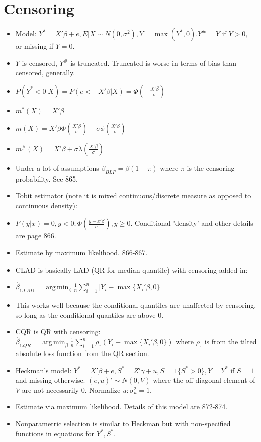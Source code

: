\documentclass[11pt]{article} %
\DeclareMathOperator*{\argmin}{arg\,min}
\begin{document}
\section{Censoring}
\begin{itemize}
\item Model: $Y^{*} = X'\beta + e, E|X \sim N(0,\sigma^2), Y = \max (Y^{*},0). Y^{\#} = Y$ if $Y>0,$ or missing if $Y=0$. 
\item $Y$ is censored, $Y^{\#}$ is truncated. Truncated is worse in terms of bias than censored, generally.
\item $P(Y^{*}<0|X) = P(e<-X'\beta|X) = \Phi\left(-\frac{X'\beta}{\sigma}\right)$
\item $m^{*}(X) = X'\beta$
\item $m(X) = X'\beta \Phi \left( \frac{X'\beta}{\sigma} \right) + \sigma \phi \left( \frac{X'\beta}{\sigma} \right)$
\item $m^{\#}(X) = X'\beta + \sigma \lambda \left( \frac{X'\beta}{\sigma} \right) $
\item Under a lot of assumptions $\beta_{BLP} = \beta (1-\pi)$ where $\pi$ is the censoring probability. See 865.
\item Tobit estimator (note it is mixed continuous/discrete measure as opposed to continuous density):
\item $F(y|x) = 0, y<0; \Phi \left( \frac{y-x'\beta}{\sigma} \right), y\geq 0$. Conditional 'density' and other details are page 866.
\item Estimate by maximum likelihood. 866-867.
\item CLAD is basically LAD (QR for median quantile) with censoring added in:
\item $\hat{\beta}_{CLAD} = \argmin_{\beta} \frac{1}{n}\sum_{i=1}^n |Y_i - \max \{ X_i'\beta, 0 \}|$
\item This works well because the conditional quantiles are unaffected by censoring, so long as the conditional quantiles are above $0$.
\item CQR is QR with censoring: $\hat{\beta}_{CQR} = \argmin_{\beta} \frac{1}{n}\sum_{i=1}^n \rho_{\tau}(Y_i - \max \{ X_i'\beta, 0 \})$ where $\rho_{\tau}$ is from the tilted absolute loss function from the QR section.
\item Heckman's model: $Y^{*} = X'\beta + e, S^{*} = Z'\gamma + u, S = 1\{ S^{*} > 0 \}, Y = Y^{*}$ if $S=1$ and missing otherwise. $(e,u)' \sim N(0,V)$ where the off-diagonal element of $V$ are not necessarily $0$. Normalize $u: \sigma^2_u = 1$.
\item Estimate via maximum likelihood. Details of this model are 872-874.
\item Nonparametric selection is similar to Heckman but with non-specified functions in equations for $Y^{*},S^{*}.$
\end{itemize}
\end{document}
